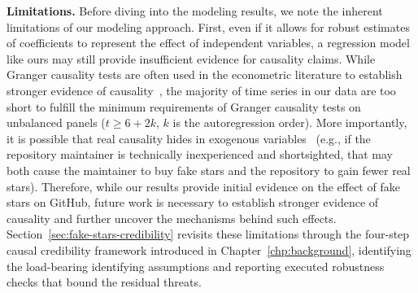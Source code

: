 \textbf{Limitations.}
Before diving into the modeling results, we note the inherent limitations of our modeling approach.
First, even if it allows for robust estimates of coefficients to represent the effect of independent variables, a regression model like ours may still provide insufficient evidence for causality claims.
While Granger causality tests are often used in the econometric literature to establish stronger evidence of causality~\cite{dumitrescu2012testing}, the majority of time series in our data are too short to fulfill the minimum requirements of Granger causality tests on unbalanced panels ($t \ge 6+2k$, $k$ is the autoregression order).
More importantly, it is possible that real causality hides in exogenous variables~\cite{engle1983exogeneity} (e.g., if the repository maintainer is technically inexperienced and shortsighted, that may both cause the maintainer to buy fake stars and the repository to gain fewer real stars).
Therefore, while our results provide initial evidence on the effect of fake stars on GitHub, future work is necessary to establish stronger evidence of causality and further uncover the mechanisms behind such effects.
Section~\ref{sec:fake-stars-credibility} revisits these limitations through the four-step causal credibility framework introduced in Chapter~\ref{chp:background}, identifying the load-bearing identifying assumptions and reporting executed robustness checks that bound the residual threats.

